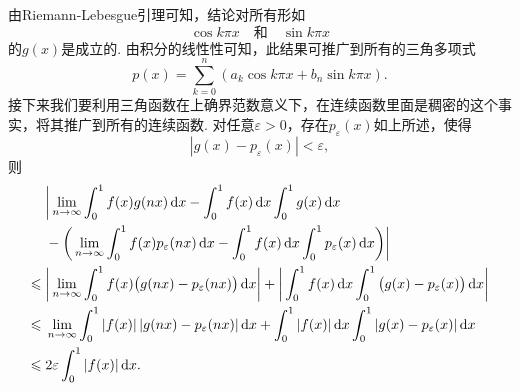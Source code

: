 \begin{ans}
  由Riemann-Lebesgue引理可知，结论对所有形如
  \[\cos k\pi x\quad \text{和}\quad \sin k\pi x\]
  的$g(x)$是成立的. 由积分的线性性可知，此结果可推广到所有的三角多项式
  \[ p(x)=\sum_{k=0}^n(a_k\cos k\pi x+b_n\sin k\pi x). \]
  接下来我们要利用三角函数在上确界范数意义下，在连续函数里面是稠密的这个事实，将其推广到所有的连续函数. 对任意$\varepsilon>0$，存在$p_\varepsilon(x)$如上所述，使得
  \[ |g(x)-p_\varepsilon(x)| <\varepsilon, \]
  则
  \begin{align*}
    & \bigg| 
      \lim_{n\to\infty}\int_0^1f(x)g(nx)\,\dx - 
      \int_0^1f(x)\,\dx\int_0^1g(x)\,\dx\\
      &-\bigg(
       \lim_{n\to\infty}\int_0^1f(x)p_\varepsilon(nx)\,\dx
       -\int_0^1f(x)\,\dx\int_0^1p_\varepsilon(x)\,\dx
      \bigg)
    \bigg|\\
    \le {} & \bigg|
      \lim_{n\to\infty}\int_0^1f(x)\big(
        g(nx)-p_\varepsilon(nx)
      \big)\,\dx
    \bigg| + \bigg|
      \int_0^1f(x)\,\dx\int_0^1\big(
        g(x) - p_\varepsilon(x)
      \big)\,\dx
    \bigg|\\
    \le {}& \lim_{n\to\infty}\int_0^1|f(x)|\,|
        g(nx)-p_\varepsilon(nx)
      |\,\dx + \int_0^1|f(x)|\,\dx\int_0^1|
        g(x) - p_\varepsilon(x)|
      \,\dx\\
    \le {}&2\varepsilon\int_0^1|f(x)|\,\dx.
  \end{align*}
\end{ans}




